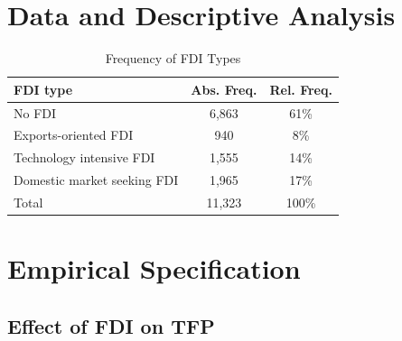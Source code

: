 \documentclass[a4paper,11pt]{scrartcl}
\begin{document}
\section{Data and Descriptive Analysis}
\begin{table}

  \centering
   \caption{Frequency of FDI Types} 

\begin{tabular}{lcc} \hline
 FDI type&Abs. Freq.&Rel. Freq. \\
\hline
No FDI&6,863 & 61\% \\
Exports-oriented FDI&940 & 8\%\\
Technology intensive FDI & 1,555 & 14\% \\
Domestic market seeking FDI & 1,965 & 17\% \\
Total & 11,323 & 100\% \\
\end{tabular}
\end{table}


\section{Empirical Specification}

\subsection{Effect of FDI on TFP}
\end{document}
